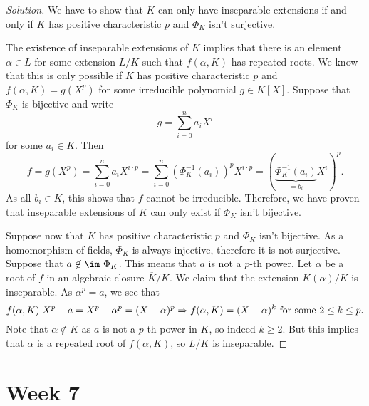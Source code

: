 \documentclass[a4paper,10pt,reqno]{amsart}
\newenvironment{sol}
  {\renewcommand\qedsymbol{$\blacksquare$}\begin{proof}[Solution]}
  {\end{proof}}
\begin{document}
\begin{sol}
We have to show that $K$ can only have inseparable extensions if and only if $K$ has positive characteristic $p$ and $\Phi_K$ isn't surjective.

The existence of inseparable extensions of $K$ implies that there is an element $\alpha \in L$ for some extension $L/K$ such that $f(\alpha,K)$ has repeated roots. We know that this is only possible if $K$ has positive characteristic $p$ and $f(\alpha,K) = g(X^p)$ for some irreducible polynomial $g \in K[X]$. Suppose that $\Phi_K$ is bijective and write
\[
g = \sum_{i=0}^n a_iX^i
\]
for some $a_i \in K$. Then
\[
f = g(X^p) = \sum_{i=0}^n a_iX^{i\cdot p} = \sum_{i=0}^n (\Phi_K^{-1}(a_i))^pX^{i\cdot p} = \left( \underbrace{\Phi_K^{-1}(a_i)}_{=b_i}X^i \right)^p.
\]
As all $b_i \in K$, this shows that $f$ cannot be irreducible. Therefore, we have proven that inseparable extensions of $K$ can only exist if $\Phi_K$ isn't bijective.

Suppose now that $K$ has positive characteristic $p$ and $\Phi_K$ isn't bijective. As a homomorphism of fields, $\Phi_K$ is always injective, therefore it is not surjective. Suppose that $a \not\in \im\ \Phi_K$. This means that $a$ is not a $p$-th power. Let $\alpha$ be a root of $f$ in an algebraic closure $\overline{K}/K$. We claim that the extension $K(\alpha)/K$ is inseparable. As $\alpha^p = a$, we see that
\[
f(\alpha, K) | X^p - a = X^p - \alpha^p = (X - \alpha)^p \Rightarrow f(\alpha,K) = (X- \alpha)^k \textnormal{ for some } 2 \leq k \leq p.
\]
Note that $\alpha \not\in K$ as $a$ is not a $p$-th power in $K$, so indeed $k \geq 2$. But this implies that $\alpha$ is a repeated root of $f(\alpha,K)$, so $L/K$ is inseparable.
\end{sol}



\newpage

\section{Week 7}
\end{document}
